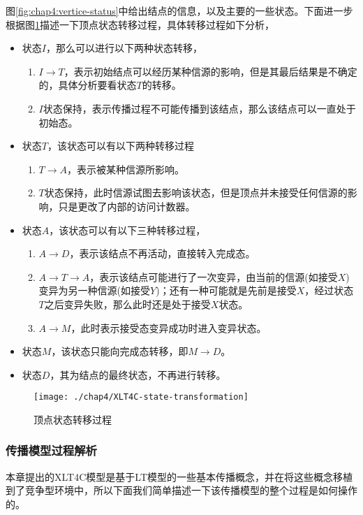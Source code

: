 图\ref{fig:chap4:vertice-status}中给出结点的信息，以及主要的一些状态。下面进一步根据图\ref{fig:chap4:state-xformation}描述一下顶点状态转移过程，具体转移过程如下分析，
\begin{itemize}
\item 状态$I$，那么可以进行以下两种状态转移，
	\begin{enumerate}
	\item $I \rightarrow T$，表示初始结点可以经历某种信源的影响，但是其最后结果是不确定的，具体分析要看状态$T$的转移。
	\item $I$状态保持，表示传播过程不可能传播到该结点，那么该结点可以一直处于初始态。
	\end{enumerate}
\item 状态$T$，该状态可以有以下两种转移过程
	\begin{enumerate}
	\item $T \rightarrow A$，表示被某种信源所影响。
	\item $T$状态保持，此时信源试图去影响该状态，但是顶点并未接受任何信源的影响，只是更改了内部的访问计数器。
	\end{enumerate}
\item 状态$A$，该状态可以有以下三种转移过程，
	\begin{enumerate}
	\item $A \rightarrow D$，表示该结点不再活动，直接转入完成态。
	\item $A \rightarrow T \rightarrow A$，表示该结点可能进行了一次变异，由当前的信源(如接受$X$)变异为另一种信源(如接受$Y$)；还有一种可能就是先前是接受$X$，经过状态$T$之后变异失败，那么此时还是处于接受$X$状态。
	\item $A \rightarrow M$，此时表示接受态变异成功时进入变异状态。
	\end{enumerate}
\item 状态$M$，该状态只能向完成态转移，即$M \rightarrow D$。
\item 状态$D$，其为结点的最终状态，不再进行转移。
\end{itemize}

\begin{figure}[H]
	\centering%
	\texttt{[image: ./chap4/XLT4C-state-transformation]}
	\caption{顶点状态转移过程}
	\label{fig:chap4:state-xformation}
\end{figure}


\subsubsection{传播模型过程解析}
\label{sec:xlt4c:model-analysis}
本章提出的XLT4C模型是基于LT模型的一些基本传播概念，并在将这些概念移植到了竞争型环境中，所以下面我们简单描述一下该传播模型的整个过程是如何操作的。


